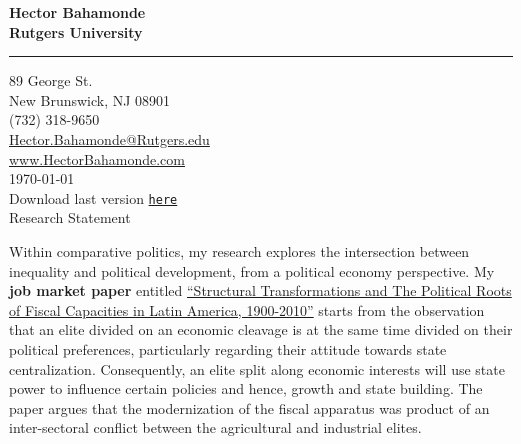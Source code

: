 \documentclass[11pt]{letter} %
\date{}
\begin{document}

\begin{letter}{} 


\begin{center}
\large\bf Hector Bahamonde \\ %
Rutgers University\\
\vspace{20pt} \hrule height 1pt %
89 George St. \\ New Brunswick, NJ 08901 \\ (732) 318-9650 \\ 
{\normalfont\normalsize\href{mailto:hector.bahamonde@rutgers.edu}{Hector.Bahamonde@Rutgers.edu}} \\
{\normalfont\normalsize\href{http://www.hectorbahamonde.com}{www.HectorBahamonde.com}}\\
{\normalfont \scriptsize{
\vspace{5mm}\today\\
Download last version \href{http://github.com/hbahamonde/Job_Market/raw/master/Bahamonde_Research_Statement.pdf}{\texttt{\color{red}here}}}} %
\\
{\huge\vspace{3mm} Research Statement}
\end{center} 


\opening{} 
 
\vspace{-1.5cm}Within comparative politics, my research explores the intersection between inequality and political development, from a political economy perspective. My {\bf job market paper} entitled \href{https://github.com/hbahamonde/IncomeTaxAdoption/raw/master/Bahamonde_IncomeTaxAdoption.pdf}{``Structural Transformations and The Political Roots of Fiscal Capacities in Latin America, 1900-2010''} starts from the observation that an elite divided on an economic cleavage is at the same time divided on their political preferences, particularly regarding their attitude towards state centralization. Consequently, an elite split along economic interests will use state power to influence certain policies and hence, growth and state building. The paper argues that the modernization of the fiscal apparatus was product of an inter-sectoral conflict between the agricultural and industrial elites. 


\end{letter}
\end{document}

